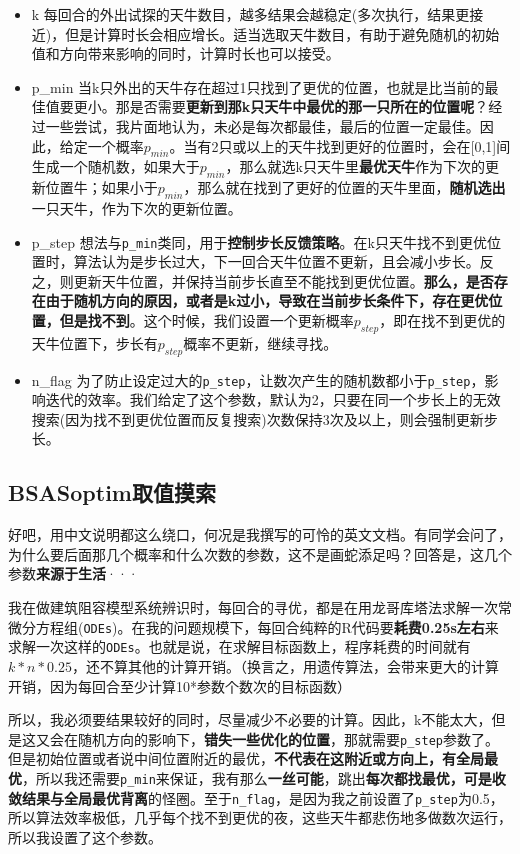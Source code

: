 \documentclass[]{ctexbook}
\providecommand{\tightlist}{%
  \setlength{\itemsep}{0pt}\setlength{\parskip}{0pt}}
\theoremstyle{definition}
\theoremstyle{definition}
\theoremstyle{definition}
\theoremstyle{remark}
\begin{document}
\begin{itemize}
\tightlist
\item
  k
  每回合的外出试探的天牛数目，越多结果会越稳定(多次执行，结果更接近)，但是计算时长会相应增长。适当选取天牛数目，有助于避免随机的初始值和方向带来影响的同时，计算时长也可以接受。
\item
  p\_min
  当k只外出的天牛存在超过1只找到了更优的位置，也就是比当前的最佳值要更小。那是否需要\textbf{更新到那k只天牛中最优的那一只所在的位置呢}？经过一些尝试，我片面地认为，未必是每次都最佳，最后的位置一定最佳。因此，给定一个概率\(p_{min}\)。当有2只或以上的天牛找到更好的位置时，会在{[}0,1{]}间生成一个随机数，如果大于\(p_{min}\)，那么就选k只天牛里\textbf{最优天牛}作为下次的更新位置牛；如果小于\(p_{min}\)，那么就在找到了更好的位置的天牛里面，\textbf{随机选出}一只天牛，作为下次的更新位置。
\item
  p\_step
  想法与\texttt{p\_min}类同，用于\textbf{控制步长反馈策略}。在k只天牛找不到更优位置时，算法认为是步长过大，下一回合天牛位置不更新，且会减小步长。反之，则更新天牛位置，并保持当前步长直至不能找到更优位置。\textbf{那么，是否存在由于随机方向的原因，或者是k过小，导致在当前步长条件下，存在更优位置，但是找不到}。这个时候，我们设置一个更新概率\(p_{step}\)，即在找不到更优的天牛位置下，步长有\(p_{step}\)概率不更新，继续寻找。
\item
  n\_flag
  为了防止设定过大的\texttt{p\_step}，让数次产生的随机数都小于\texttt{p\_step}，影响迭代的效率。我们给定了这个参数，默认为2，只要在同一个步长上的无效搜索(因为找不到更优位置而反复搜索)次数保持3次及以上，则会强制更新步长。
\end{itemize}

\subsection{BSASoptim取值摸索}\label{BSAStrick}

好吧，用中文说明都这么绕口，何况是我撰写的可怜的英文文档。有同学会问了，为什么要后面那几个概率和什么次数的参数，这不是画蛇添足吗？回答是，这几个参数\textbf{来源于生活}···

我在做建筑阻容模型系统辨识时，每回合的寻优，都是在用龙哥库塔法求解一次常微分方程组(\texttt{ODEs})。在我的问题规模下，每回合纯粹的R代码要\textbf{耗费0.25s左右}来求解一次这样的\texttt{ODEs}。也就是说，在求解目标函数上，程序耗费的时间就有\(k*n*0.25\)，还不算其他的计算开销。（换言之，用遗传算法，会带来更大的计算开销，因为每回合至少计算10*参数个数次的目标函数）

所以，我必须要结果较好的同时，尽量减少不必要的计算。因此，k不能太大，但是这又会在随机方向的影响下，\textbf{错失一些优化的位置}，那就需要\texttt{p\_step}参数了。但是初始位置或者说中间位置附近的最优，\textbf{不代表在这附近或方向上，有全局最优}，所以我还需要\texttt{p\_min}来保证，我有那么\textbf{一丝可能}，跳出\textbf{每次都找最优，可是收敛结果与全局最优背离}的怪圈。至于\texttt{n\_flag}，是因为我之前设置了\texttt{p\_step}为0.5，所以算法效率极低，几乎每个找不到更优的夜，这些天牛都悲伤地多做数次运行，所以我设置了这个参数。
\end{document}
